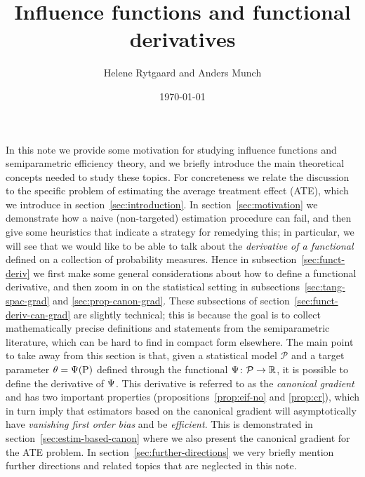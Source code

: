 \documentclass[a4,danish]{article}
\title{Influence functions and functional derivatives}
\author{Helene Rytgaard and Anders Munch}
\date{\today}
\begin{document}
\maketitle


In this note we provide some motivation for studying influence functions and semiparametric
efficiency theory, and we briefly introduce the main theoretical concepts needed to study these
topics. For concreteness we relate the discussion to the specific problem of estimating the average
treatment effect (ATE), which we introduce in section~\ref{sec:introduction}. In
section~\ref{sec:motivation} we demonstrate how a naive (non-targeted) estimation procedure can
fail, and then give some heuristics that indicate a strategy for remedying this; in particular, we
will see that we would like to be able to talk about the \textit{derivative of a functional} defined
on a collection of probability measures. Hence in subsection~\ref{sec:funct-deriv} we first make
some general considerations about how to define a functional derivative, and then zoom in on the
statistical setting in subsections~\ref{sec:tang-spac-grad} and \ref{sec:prop-canon-grad}. These
subsections of section~\ref{sec:funct-deriv-can-grad} are slightly technical; this is because the
goal is to collect mathematically precise definitions and statements from the semiparametric
literature, which can be hard to find in compact form elsewhere. The main point to take away from
this section is that, given a statistical model $\mathcal{P}$ and a target parameter
$\theta = \operatorname{\Psi}(\mathrm{{P}})$ defined through the functional $\operatorname{\Psi} \colon \mathcal{P} \rightarrow \mathbb{R}$, it is
possible to define the derivative of $\operatorname{\Psi}$. This derivative is referred to as the \textit{canonical
  gradient} and has two important properties (propositions~\ref{prop:eif-no} and \ref{prop:cr}),
which in turn imply that estimators based on the canonical gradient will asymptotically have
\textit{vanishing first order bias} and be \textit{efficient}. This is demonstrated in
section~\ref{sec:estim-based-canon} where we also present the canonical gradient for the ATE
problem. In section~\ref{sec:further-directions} we very briefly mention further directions and
related topics that are neglected in this note.
\end{document}
